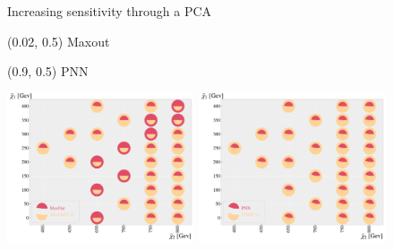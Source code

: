 \documentclass[UKenglish]{beamer}
\begin{document}

\begin{frame}{Increasing sensitivity through a PCA}

    \begin{textblock}{0.8}(0.02, 0.5)
        {Maxout}
    \end{textblock}
    \begin{textblock}{0.8}(0.9, 0.5)
        {PNN}
    \end{textblock}
    \vfill
    \begin{center}
        \includegraphics[width=0.415\textwidth]{figures/Comps/MaxOutPCANetworkComp.pdf}
        \includegraphics[width=0.415\textwidth]{figures/Comps/PNNPCANetworkComp.pdf}
    \end{center}
\end{frame}
\end{document}
